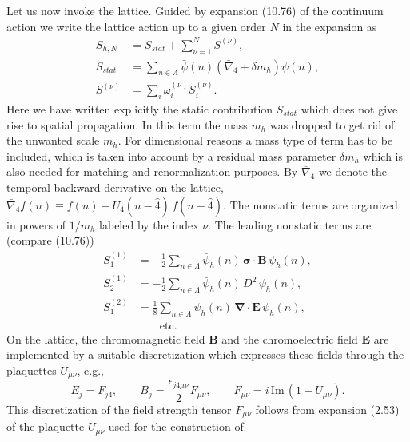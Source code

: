 Let us now invoke the lattice. Guided by expansion (10.76) of the continuum
action we write the lattice action up to a given order $N$ in the expansion as
\begin{equation}
  \begin{split}
    S_{h,N} &= S_{stat} + \sum_{\nu=1}^{N}S^{(\nu)} , \\
    S_{stat} &= \sum_{n\in\Lambda}
    \bar\psi(n)\left(\bar\nabla_4 + \delta m_h\right)\psi(n) , \\
    S^{(\nu)} &= \sum_i \omega_i^{(\nu)} S_i^{(\nu)} .
  \end{split}
\end{equation}
Here we have written explicitly the static contribution $S_{stat}$ which does
not give rise to spatial propagation. In this term the mass $m_h$ was dropped
to get rid of the unwanted scale $m_h$. For dimensional reasons a mass type of
term has to be included, which is taken into account by a residual mass
parameter $\delta m_h$ which is also needed for matching and renormalization
purposes. By $\bar\nabla_4$ we denote the temporal backward derivative on the
lattice, $\bar\nabla_4 f(n) \equiv f(n) - U_4(n-\hat 4)\,f(n-\hat 4)$. The
nonstatic terms are organized in powers of $1/m_h$ labeled by the index
$\nu$. The leading nonstatic terms are (compare (10.76))
\begin{equation}
  \begin{split}
    S_1^{(1)} &= -\frac{1}{2}\sum_{n\in\Lambda}
    \bar\psi_h(n)\,\boldsymbol{\sigma}\cdot\boldsymbol{B}\,\psi_h(n) , \\
    S_2^{(1)} &= -\frac{1}{2}\sum_{n\in\Lambda}
    \bar\psi_h(n)\,D^2\,\psi_h(n) , \\
    S_1^{(2)} &= \frac{1}{8}\sum_{n\in\Lambda}
    \bar\psi_h(n)\,\boldsymbol{\nabla}\cdot\boldsymbol{E}\,\psi_h(n) , \\
    &\qquad \text{etc.}
  \end{split}
\end{equation}
On the lattice, the chromomagnetic field $\boldsymbol{B}$ and the
chromoelectric field $\boldsymbol{E}$ are implemented by a suitable
discretization which expresses these fields through the plaquettes $U_{\mu\nu}$,
e.g.,
\begin{equation}
  E_j = F_{j4} , \qquad B_j = \frac{\epsilon_{j4\mu\nu}}{2}F_{\mu\nu} , \qquad
  F_{\mu\nu} = i\,\mathrm{Im}\,(1 - U_{\mu\nu}) .
\end{equation}
This discretization of the field strength tensor $F_{\mu\nu}$ follows from
expansion (2.53) of the plaquette $U_{\mu\nu}$ used for the construction of
